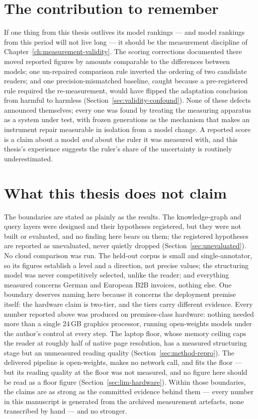 \section*{The contribution to remember}

If one thing from this thesis outlives its model rankings --- and model rankings from
this period will not live long --- it should be the measurement discipline of
Chapter~\ref{ch:measurement-validity}. The scoring corrections documented there moved
reported figures by amounts comparable to the differences between models; one
un-repaired comparison rule inverted the ordering of two candidate readers; and one
precision-mismatched baseline, caught because a pre-registered rule required the
re-measurement, would have flipped the adaptation conclusion from harmful to harmless
(Section~\ref{sec:validity-confound}). None of these defects announced themselves; every one
was found by treating the measuring apparatus as a system under test, with frozen
generations as the mechanism that makes an instrument repair measurable in isolation
from a model change. A reported score is a claim about a model \emph{and} about the
ruler it was measured with, and this thesis's experience suggests the ruler's share of
the uncertainty is routinely underestimated.

\section*{What this thesis does not claim}

The boundaries are stated as plainly as the results. The knowledge-graph and query
layers were designed and their hypotheses registered, but they were not built or
evaluated, and no finding here bears on them; the registered hypotheses are reported as
unevaluated, never quietly dropped (Section~\ref{sec:unevaluated}). No cloud comparison
was run. The held-out corpus is small and single-annotator, so its figures establish a
level and a direction, not precise values; the structuring model was never
competitively selected, unlike the reader; and everything measured concerns German and
European \ac{B2B} invoices, nothing else. One boundary deserves naming here because it
concerns the deployment premise itself: the hardware claim is two-tier, and the tiers carry
different evidence. Every number reported above was produced on premises-class hardware:
nothing needed more than a single 24\,\ac{GB} graphics processor, running open-weights models
under the author's control at every step. The laptop floor, whose memory ceiling caps
the reader at roughly half of native page resolution, has a measured structuring stage but an
unmeasured reading quality (Section~\ref{sec:method-repro}). The delivered pipeline is open-weights,
makes no network call, and fits the floor --- but its reading quality at the floor was not
measured, and no figure here should be read as a floor figure
(Section~\ref{sec:lim-hardware}). Within those boundaries, the claims are as
strong as the committed evidence behind them --- every number in this manuscript is
generated from the archived measurement artefacts, none transcribed by hand ---
and no stronger.

